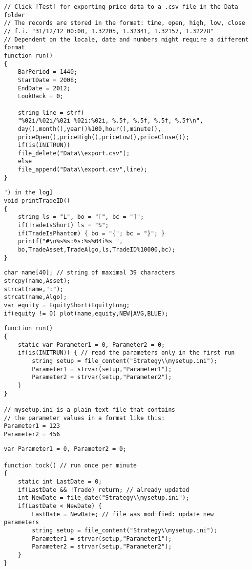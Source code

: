 \begin{lstlisting}[caption=Export historic price data to a .csv file]
// Click [Test] for exporting price data to a .csv file in the Data folder
// The records are stored in the format: time, open, high, low, close 
// f.i. "31/12/12 00:00, 1.32205, 1.32341, 1.32157, 1.32278"
// Dependent on the locale, date and numbers might require a different format
function run()
{
	BarPeriod = 1440;
	StartDate = 2008;
	EndDate = 2012;
	LookBack = 0;
	
	string line = strf(
	"%02i/%02i/%02i %02i:%02i, %.5f, %.5f, %.5f, %.5f\n",
	day(),month(),year()%100,hour(),minute(),
	priceOpen(),priceHigh(),priceLow(),priceClose());
	if(is(INITRUN))
	file_delete("Data\\export.csv");
	else
	file_append("Data\\export.csv",line);
}
\end{lstlisting}
\begin{lstlisting}[caption=Print the description of a trade (like "[AUD/USD:CY:S1234]") in the log]
void printTradeID()
{
	string ls = "L", bo = "[", bc = "]";
	if(TradeIsShort) ls = "S";
	if(TradeIsPhantom) { bo = "{"; bc = "}"; }
	printf("#\n%s%s:%s:%s%04i%s ",
	bo,TradeAsset,TradeAlgo,ls,TradeID%10000,bc);
}
\end{lstlisting}
\begin{lstlisting}[caption=Plot equity curves of single assets in a multi-asset strategy]
char name[40]; // string of maximal 39 characters
strcpy(name,Asset);
strcat(name,":");
strcat(name,Algo);
var equity = EquityShort+EquityLong;
if(equity != 0) plot(name,equity,NEW|AVG,BLUE);
\end{lstlisting}

\begin{lstlisting}[caption=Set up strategy parameters from a .ini file at the start]
function run()
{
	static var Parameter1 = 0, Parameter2 = 0;
	if(is(INITRUN)) { // read the parameters only in the first run
		string setup = file_content("Strategy\\mysetup.ini");
		Parameter1 = strvar(setup,"Parameter1");
		Parameter2 = strvar(setup,"Parameter2");
	}
}

// mysetup.ini is a plain text file that contains
// the parameter values in a format like this:
Parameter1 = 123
Parameter2 = 456
\end{lstlisting}
\begin{lstlisting}[caption=Check every minute in Trade mode if an .ini file was modified]
var Parameter1 = 0, Parameter2 = 0;

function tock() // run once per minute
{
	static int LastDate = 0;
	if(LastDate && !Trade) return; // already updated
	int NewDate = file_date("Strategy\\mysetup.ini");
	if(LastDate < NewDate) {
		LastDate = NewDate; // file was modified: update new parameters
		string setup = file_content("Strategy\\mysetup.ini");
		Parameter1 = strvar(setup,"Parameter1");
		Parameter2 = strvar(setup,"Parameter2");
	}
}
\end{lstlisting}

